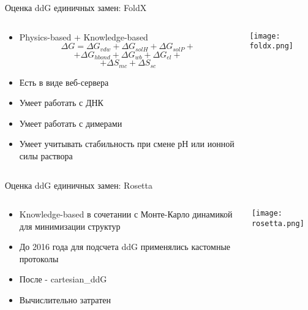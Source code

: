 \begin{frame}{Оценка ddG единичных замен: FoldX}
    \begin{columns}
\begin{column}{0.4\textwidth}
    \begin{itemize}
        \item Physics-based + Knowledge-based
            \[ \Delta G =   \Delta G_{vdw} + \Delta G_{solH} + \Delta G_{solP}  + \]
            \[ + \Delta G_{hbond} + \Delta G_{wb}  + \Delta G_{el} +\]
            \[ + \Delta S_{mc} + \Delta S_{sc}\]
        \item Есть в виде веб-сервера
        \item Умеет работать с ДНК
        \item Умеет работать с димерами
        \item Умеет учитывать стабильность при смене рН или ионной силы раствора
    \end{itemize}
\end{column}
\begin{column}{0.6\textwidth}
    \texttt{[image: foldx.png]}
\end{column}
\end{columns}
\end{frame}


\begin{frame}{Оценка ddG единичных замен: Rosetta}
    \begin{columns}
\begin{column}{0.5\textwidth}
    \begin{itemize}
        \item Knowledge-based в сочетании с Монте-Карло динамикой для минимизации структур
        \item До 2016 года для подсчета ddG применялись кастомные протоколы
        \item После - cartesian\_ddG
        \item Вычислительно затратен
    \end{itemize}
\end{column}
\begin{column}{0.5\textwidth}
    \texttt{[image: rosetta.png]}
\end{column}
\end{columns}
\end{frame}


